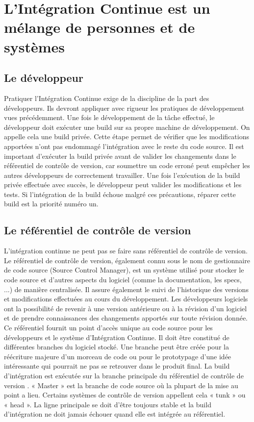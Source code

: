   \section{L’Intégration Continue est un mélange de personnes et de systèmes}

    \subsection{Le développeur}
    Pratiquer l’Intégration Continue exige de la discipline de la part des développeurs. Ils devront appliquer avec rigueur les pratiques de développement vues précédemment. Une fois le développement de la tâche effectué, le développeur doit exécuter une build sur sa propre machine de développement. On appelle cela une build privée. Cette étape permet de vérifier que les modifications apportées n’ont pas endommagé l'intégration avec le reste du code source. Il est important d'exécuter la build privée avant de valider les changements dans le référentiel de contrôle de version, car soumettre un code erroné peut empêcher les autres développeurs de correctement travailler. Une fois l’exécution de la build privée effectuée avec succès, le développeur peut valider les modifications et les tests. Si l'intégration de la build échoue malgré ces précautions, réparer cette build est la priorité numéro un.

    \subsection{Le référentiel de contrôle de version}\label{SCM}
    L'intégration continue ne peut pas se faire sans référentiel de contrôle de version. Le référentiel de contrôle de version, également connu sous le nom de gestionnaire de code source (Source Control Manager), est un système utilisé pour stocker le code source et d'autres aspects du logiciel (comme la documentation, les specs, ...) de manière centralisée. Il assure également le suivi de l'historique des versions et modifications effectuées au cours du développement. Les développeurs logiciels ont la possibilité de revenir à une version antérieure ou à la révision d'un logiciel et de prendre connaissances des changements apportés sur toute révision donnée. Ce référentiel fournit un point d'accès unique au code source pour les développeurs et le système d’Intégration Continue. Il doit être constitué de différentes branches du logiciel stocké. Une branche peut être créée pour la réécriture majeure d’un morceau de code ou pour le prototypage d’une idée intéressante qui pourrait ne pas se retrouver dans le produit final. La build d’intégration est exécutée sur la branche principale du référentiel de contrôle de version \cite{Duv07}. « Master » est la branche de code source où la plupart de la mise au point a lieu. Certains systèmes de contrôle de version appellent cela « tunk » ou « head ». La ligne principale se doit d’être toujours stable et la build d’intégration ne doit jamais échouer quand elle est intégrée au référentiel.

